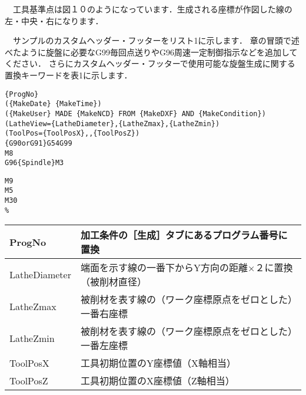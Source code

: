\begin{itemize}

　工具基準点は図１０のようになっています．生成される座標が作図した線の左・中央・右になります．
\end{itemize}

　サンプルのカスタムヘッダー・フッターをリスト1に示します．
章の冒頭で述べたように旋盤に必要なG99毎回点送りやG96周速一定制御指示などを追加してください．
さらにカスタムヘッダー・フッターで使用可能な旋盤生成に関する置換キーワードを表1に示します．

\begin{minipage}[t]{0.75\textwidth}
\begin{lstlisting}[caption=Header.txt,numbers=none,label=lst:header.txt]
%
{ProgNo}
({MakeDate} {MakeTime})
({MakeUser} MADE {MakeNCD} FROM {MakeDXF} AND {MakeCondition})
(LatheView={LatheDiameter},{LatheZmax},{LatheZmin})
(ToolPos={ToolPosX},,{ToolPosZ})
{G90orG91}G54G99
M8
G96{Spindle}M3
\end{lstlisting}
\end{minipage}
\begin{minipage}[t]{0.25\textwidth}
\begin{lstlisting}[caption=Footer.txt,numbers=none,label=lst:footer.txt]
M9
M5
M30
%
\end{lstlisting}
\end{minipage}

\begin{table}[H]
\centering
\begin{tabular}{|p{3cm}|p{10cm}|}
\hline
ProgNo & 加工条件の［生成］タブにあるプログラム番号に置換 \\ \hline
LatheDiameter & 端面を示す線の一番下からY方向の距離×２に置換（被削材直径）\\ \hline
LatheZmax & 被削材を表す線の（ワーク座標原点をゼロとした）一番右座標 \\ \hline
LatheZmin & 被削材を表す線の（ワーク座標原点をゼロとした）一番左座標 \\ \hline
ToolPosX & 工具初期位置のY座標値（X軸相当）\\ \hline
ToolPosZ & 工具初期位置のX座標値（Z軸相当）\\ \hline
\end{tabular}
\end{table}
